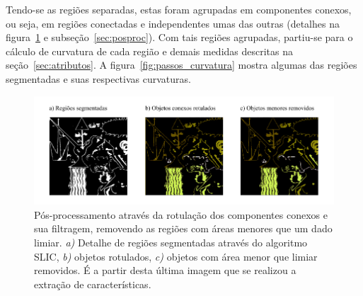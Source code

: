 Tendo-se as regiões separadas, estas foram agrupadas em componentes
conexos, ou seja, em regiões conectadas e independentes umas das
outras (detalhes na figura~\ref{fig:rotulacao} e
subseção~\ref{sec:posproc}). Com tais regiões agrupadas, partiu-se
para o cálculo de curvatura de cada região e demais medidas descritas
na seção~\ref{sec:atributos}. A figura~\ref{fig:passos_curvatura} mostra algumas das regiões segmentadas e suas respectivas curvaturas.

\begin{figure}[h!]
\begin{center}
          \caption{Pós-processamento através da rotulação dos componentes
        conexos e sua filtragem, removendo as regiões com áreas
        menores que um dado limiar. \textit{a)} Detalhe de regiões
        segmentadas através do algoritmo SLIC, \textit{b)} objetos
        rotulados, \textit{c)} objetos com área menor que limiar
        removidos. É a partir desta última imagem que se realizou a
        extração de características.}
        \label{fig:rotulacao}
        \includegraphics[scale=1.2]{figs/passos_rotulacao}
        \fonteminha
\end{center}
\end{figure}

